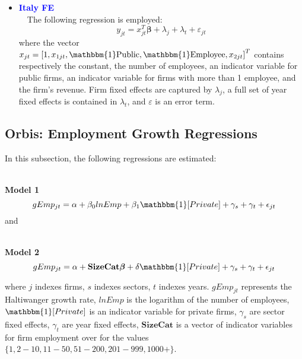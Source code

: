\documentclass[12pt,notitlepage]{article}
\newcommand{\sym}[1] {\ifmmode^{#1} \else\(^{#1}\) \fi}
\begin{document}
\begin{itemize}
\clearpage
\item \textcolor{blue}{\textbf{Italy FE}}\\~\
The following regression is employed:
	\begin{equation}
	y_{jt} = x^{T}_{jt}\mathbf{\beta} + \lambda_{j}  + \lambda_{t} + \varepsilon_{jt}
	\end{equation}
where the vector $x_{jt} = \left[  1, x_{1jt}, \mathbbm{1}\text{Public}, \mathbbm{1}\text{Employee}, x_{2jt} \right]^{T} $ contains respectively the constant, the number of employees, an indicator variable for public firms, an indicator variable for firms with more than 1 employee, and the firm's revenue. Firm fixed effects are captured by $\lambda_{j}$, a full set of year fixed effects is contained in $\lambda_{t}$, and $\varepsilon$ is an error term.
\begin{table}[htbp]\centering
\def\sym#1{\ifmmode^{#1}\else\(^{#1}\)\fi}
\caption{Haltiwanger growth rate}
\end{table}
\end{itemize}
\clearpage




\subsection{Orbis: Employment Growth Regressions}

In this subsection, the following regressions are estimated: \\~\

\textbf{Model 1}
	\begin{equation*}
		gEmp_{jt} = \alpha + \beta_0 lnEmp + \beta_1 \mathbbm{1}[Private] + \gamma_s + \gamma_t + \epsilon_{jt} 
	\end{equation*}
and\\~\

\textbf{Model 2}
	\begin{equation*}
		gEmp_{jt} = \alpha + \mathbf{SizeCat} \boldsymbol{\beta} + \delta \mathbbm{1}[Private] + \gamma_s + \gamma_t + \epsilon_{jt} 
	\end{equation*}

where $j$ indexes firms, $s$ indexes sectors, $t$ indexes years. $gEmp_{jt}$ represents the Haltiwanger growth rate, $lnEmp$ is the logarithm of the number of employees, $\mathbbm{1}[Private]$ is an indicator variable for private firms,  $\gamma_s$ are sector fixed effects, $\gamma_t$ are year fixed effects, $\mathbf{SizeCat}$  is a vector of indicator variables for firm employment over for the values $\lbrace 1,2-10,11-50,51-200,201-999,1000+ \rbrace$.\\~\
\end{document}
